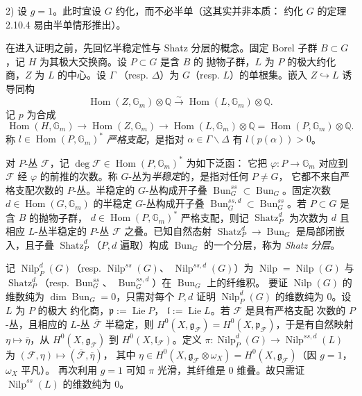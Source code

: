 2) 设 $g=1$。此时宜设 $G$ 约化，而不必半单（这其实并非本质：
约化 $G$ 的定理 2.10.4 易由半单情形推出）。

在进入证明之前，先回忆半稳定性与 Shatz 分层的概念。固定 Borel 子群
$B\subset G$，记 $H$ 为其极大交换商。设 $P\subset G$ 是含 $B$ 的
抛物子群，$L$ 为 $P$ 的极大约化商，$Z$ 为 $L$ 的中心。设 $\Gamma$
（resp. $\Delta$）为 $G$（resp. $L$）的单根集。嵌入
$Z\hookrightarrow L$ 诱导同构
\[
  \operatorname{Hom}(Z,\mathbb{G}_m)\otimes\mathbb{Q}
  \xrightarrow{\sim}
  \operatorname{Hom}(L,\mathbb{G}_m)\otimes\mathbb{Q}.
\]
记 $p$ 为合成
\[
  \operatorname{Hom}(H,\mathbb{G}_m)\to
  \operatorname{Hom}(Z,\mathbb{G}_m)\to
  \operatorname{Hom}(L,\mathbb{G}_m)\otimes\mathbb{Q}
  =\operatorname{Hom}(P,\mathbb{G}_m)\otimes\mathbb{Q}.
\]
称 $l\in\operatorname{Hom}(P,\mathbb{G}_m)^{*}$ \emph{严格支配}，是指对
$\alpha\in\Gamma\backslash\Delta$ 有 $l(p(\alpha))>0$。

对 $P$-丛 $\mathcal{F}$，记
$\deg\mathcal{F}\in\operatorname{Hom}(P,\mathbb{G}_m)^{*}$ 为如下泛函：
它把 $\varphi:P\to\mathbb{G}_m$ 对应到 $\mathcal{F}$ 经 $\varphi$
的前推的次数。称 $G$-丛为\emph{半稳定}的，是指对任何 $P\ne G$，
它都不来自严格支配次数的 $P$-丛。半稳定的 $G$-丛构成开子叠
$\operatorname{Bun}_G^{ss}\subset\operatorname{Bun}_G$。固定次数
$d\in\operatorname{Hom}(G,\mathbb{G}_m)$ 的半稳定 $G$-丛构成开子叠
$\operatorname{Bun}_G^{ss,d}\subset\operatorname{Bun}_G^{ss}$。若
$P\subset G$ 是含 $B$ 的抛物子群，
$d\in\operatorname{Hom}(P,\mathbb{G}_m)^{*}$ 严格支配，则记
$\operatorname{Shatz}_P^d$ 为次数为 $d$ 且相应 $L$-丛半稳定的
$P$-丛 $\mathcal{F}$ 之叠。已知自然态射
$\operatorname{Shatz}_P^d\to\operatorname{Bun}_G$ 是局部闭嵌入，且子叠%
%
$\operatorname{Shatz}_P^d$（$P,d$ 遍取）构成 $\operatorname{Bun}_G$
的一个分层，称为 \emph{Shatz 分层}。

记 $\operatorname{Nilp}_P^d(G)$（resp. $\operatorname{Nilp}^{ss}(G)$、
$\operatorname{Nilp}^{ss,d}(G)$）为
$\operatorname{Nilp}=\operatorname{Nilp}(G)$ 与
$\operatorname{Shatz}_P^d$（resp. $\operatorname{Bun}_G^{ss}$、
$\operatorname{Bun}_G^{ss,d}$）在 $\operatorname{Bun}_G$ 上的纤维积。
要证 $\operatorname{Nilp}(G)$ 的维数纯为
$\dim\operatorname{Bun}_G=0$，只需对每个 $P,d$ 证明
$\operatorname{Nilp}_P^d(G)$ 的维数纯为 $0$。设 $L$ 为 $P$ 的极大
约化商，$\mathfrak{p}:=\operatorname{Lie}P$，
$\mathfrak{l}:=\operatorname{Lie}L$。若 $\mathcal{F}$ 是具有严格支配
次数的 $P$-丛，且相应的 $L$-丛 $\overline{\mathcal{F}}$ 半稳定，则
$H^0(X,\mathfrak{g}_{\mathcal{F}})
=H^0(X,\mathfrak{p}_{\mathcal{F}})$，于是有自然映射
$\eta\mapsto\overline{\eta}$，从
$H^0(X,\mathfrak{g}_{\mathcal{F}})$ 到
$H^0(X,\mathfrak{l}_{\mathcal{F}})$。定义
$\pi:\operatorname{Nilp}_P^d(G)\to\operatorname{Nilp}^{ss,d}(L)$ 为
$(\mathcal{F},\eta)\mapsto(\overline{\mathcal{F}},\overline{\eta})$，
其中 $\eta\in H^0(X,\mathfrak{g}_{\mathcal{F}}\otimes\omega_X)
=H^0(X,\mathfrak{g}_{\mathcal{F}})$（因 $g=1$，$\omega_X$ 平凡）。
再次利用 $g=1$ 可知 $\pi$ 光滑，其纤维是 $0$ 维叠。故只需证
$\operatorname{Nilp}^{ss}(L)$ 的维数纯为 $0$。

